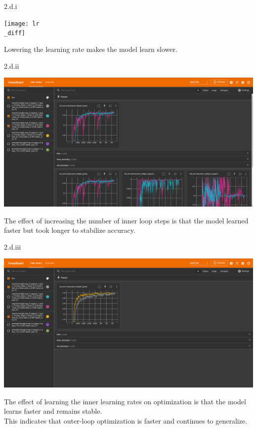 \clearpage

\LARGE
2.d.i
\normalsize

\begin{answer}
	\begin{center}
		\texttt{[image: lr\\\_diff]}
	\end{center}
	Lowering the learning rate makes the model learn slower. 
\end{answer}


\LARGE
2.d.ii
\normalsize

\begin{answer}
	\begin{center}
		\includegraphics[width=1.0\textwidth]{innerSteps}
	\end{center}
	The effect of increasing the number of inner loop steps is that the model learned faster but took longer to stabilize accuracy. \\
\end{answer}

\LARGE
2.d.iii
\normalsize

\begin{answer}
	\begin{center}
		\includegraphics[width=1.0\textwidth]{learnLR}
	\end{center}
	The effect of learning the inner learning rates on optimization is that the model learns faster and remains stable. \\
	This indicates that outer-loop optimization is faster and continues to generalize.
\end{answer}





